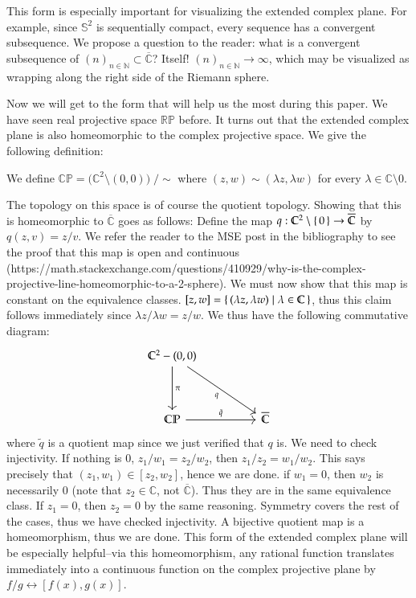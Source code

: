 \documentclass[12pt]{article}
\theoremstyle{definitionstyle}
\newenvironment{definition}{\begin{mydef}}{\end{mydef}}
\def\mbb#1{\mathbb{#1}}
\def\bN{\mbb{N}}
\def \C{\mbb{C}}
\def \R{\mbb{R}}
\renewcommand{\S}{\mbb S}
\begin{document}
	This form is especially important for visualizing the extended complex plane. For example, since $\S^2$ is sequentially compact, every sequence has a convergent subsequence. We propose a question to the reader: what is a convergent subsequence of $(n)_{n \in \bN} \subset \overline{\C}$? Itself! $(n)_{n \in \bN} \to \infty$, which may be visualized as wrapping along the right side of the Riemann sphere.
	
	
	Now we will get to the form that will help us the most during this paper. We have seen real projective space $\R \mbb P$ before. It turns out that the extended complex plane is also homeomorphic to the complex projective space. We give the following definition:
	\begin{definition}
		We define $\C \mbb P = \bigg(\C^2 \setminus (0, 0)\bigg) \; \bigg/ \sim$ where $(z, w) \sim (\lambda z, \lambda w)$ for every $\lambda \in \C \setminus 0$.
	\end{definition}
	The topology on this space is of course the quotient topology. Showing that this is homeomorphic to $\overline{\C}$ goes as follows:
	Define the map $q: \C^2 \setminus \set{0} \to \overline{\C}$ by $q(z, v) = z/v$. We refer the reader to the MSE post in the bibliography to see the proof that this map is open and continuous (https://math.stackexchange.com/questions/410929/why-is-the-complex-projective-line-homeomorphic-to-a-2-sphere). We must now show that this map is constant on the equivalence classes. $[z, w] = \set{(\lambda z, \lambda w) | \lambda \in \C}$, thus this claim follows immediately since $\lambda z / \lambda w = z/w$. We thus have the following commutative diagram:
	\[\begin{tikzcd}
		{\C^2 - (0, 0)} \\
		\\
		{\C \mbb P} && {\overline{\C}}
		\arrow["\pi", from=1-1, to=3-1]
		\arrow["q"', from=1-1, to=3-3]
		\arrow["{\tilde{q}}", from=3-1, to=3-3]
	\end{tikzcd}\]
	where $\tilde q$ is a quotient map since we just verified that $q$ is. We need to check injectivity. If nothing is 0, $z_1/w_1 = z_2/w_2$, then $z_1/z_2 = w_1/w_2$. This says precisely that $(z_1, w_1) \in [z_2, w_2]$, hence we are done. if $w_1 = 0$, then $w_2$ is necessarily 0 (note that $z_2 \in \C$, not $\overline{\C}$). Thus they are in the same equivalence class. If $z_1 = 0$, then $z_2 = 0$ by the same reasoning. Symmetry covers the rest of the cases, thus we have checked injectivity. A bijective quotient map is a homeomorphism, thus we are done. This form of the extended complex plane will be especially helpful--via this homeomorphism, any rational function translates immediately into a continuous function on the complex projective plane by $f/g \leftrightarrow [f(x), g(x)]$.
	
\end{document}
